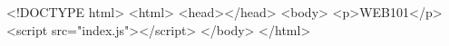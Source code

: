 <!DOCTYPE html>
<html>
    <head></head>
    <body>
        <p>WEB101</p>
        <script src="index.js"></script>
    </body>
</html>